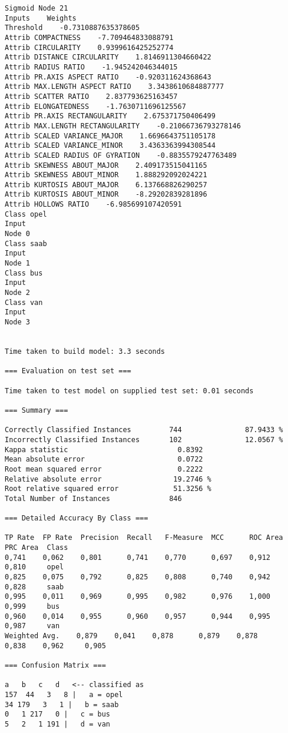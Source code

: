 \documentclass[
	article,			%
	11pt,				%
	oneside,			%
	a4paper,			%
	english,			%
	brazil,				%
	sumario=tradicional
	]{abntex2}
\begin{document}
\begin{lstlisting}
Sigmoid Node 21
Inputs    Weights
Threshold    -0.7310887635378605
Attrib COMPACTNESS    -7.709464833088791
Attrib CIRCULARITY    0.9399616425252774
Attrib DISTANCE CIRCULARITY    1.8146911304660422
Attrib RADIUS RATIO    -1.945242046344015
Attrib PR.AXIS ASPECT RATIO    -0.920311624368643
Attrib MAX.LENGTH ASPECT RATIO    3.3438610684887777
Attrib SCATTER RATIO    2.837793625163457
Attrib ELONGATEDNESS    -1.7630711696125567
Attrib PR.AXIS RECTANGULARITY    2.675371750406499
Attrib MAX.LENGTH RECTANGULARITY    -0.21066736793278146
Attrib SCALED VARIANCE_MAJOR    1.6696643751105178
Attrib SCALED VARIANCE_MINOR    3.4363363994308544
Attrib SCALED RADIUS OF GYRATION    -0.8835579247763489
Attrib SKEWNESS ABOUT_MAJOR    2.409173515041165
Attrib SKEWNESS ABOUT_MINOR    1.888292092024221
Attrib KURTOSIS ABOUT_MAJOR    6.137668826290257
Attrib KURTOSIS ABOUT_MINOR    -8.29202839281896
Attrib HOLLOWS RATIO    -6.985699107420591
Class opel
Input
Node 0
Class saab
Input
Node 1
Class bus
Input
Node 2
Class van
Input
Node 3


Time taken to build model: 3.3 seconds

=== Evaluation on test set ===

Time taken to test model on supplied test set: 0.01 seconds

=== Summary ===

Correctly Classified Instances         744               87.9433 %
Incorrectly Classified Instances       102               12.0567 %
Kappa statistic                          0.8392
Mean absolute error                      0.0722
Root mean squared error                  0.2222
Relative absolute error                 19.2746 %
Root relative squared error             51.3256 %
Total Number of Instances              846     

=== Detailed Accuracy By Class ===

TP Rate  FP Rate  Precision  Recall   F-Measure  MCC      ROC Area  PRC Area  Class
0,741    0,062    0,801      0,741    0,770      0,697    0,912     0,810     opel
0,825    0,075    0,792      0,825    0,808      0,740    0,942     0,828     saab
0,995    0,011    0,969      0,995    0,982      0,976    1,000     0,999     bus
0,960    0,014    0,955      0,960    0,957      0,944    0,995     0,987     van
Weighted Avg.    0,879    0,041    0,878      0,879    0,878      0,838    0,962     0,905     

=== Confusion Matrix ===

a   b   c   d   <-- classified as
157  44   3   8 |   a = opel
34 179   3   1 |   b = saab
0   1 217   0 |   c = bus
5   2   1 191 |   d = van


\end{lstlisting}
\end{document}
